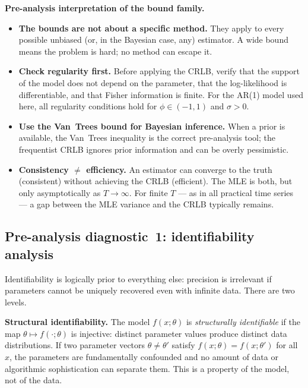 \documentclass[11pt, a4paper]{article}
\begin{document}
\begin{keybox}
\textbf{Pre-analysis interpretation of the bound family.}

\smallskip
\begin{itemize}[noitemsep]
    \item \textbf{The bounds are not about a specific method.}
    They apply to every possible unbiased (or, in the Bayesian case, any) estimator.
    A wide bound means the problem is hard; no method can escape it.
    \item \textbf{Check regularity first.}
    Before applying the CRLB, verify that the support of the model does not depend
    on the parameter, that the log-likelihood is differentiable, and that Fisher
    information is finite.
    For the AR(1) model used here, all regularity conditions hold for
    $\phi \in (-1,1)$ and $\sigma > 0$.
    \item \textbf{Use the Van~Trees bound for Bayesian inference.}
    When a prior is available, the Van~Trees inequality is the correct pre-analysis
    tool; the frequentist CRLB ignores prior information and can be overly
    pessimistic.
    \item \textbf{Consistency $\neq$ efficiency.}
    An estimator can converge to the truth (consistent) without achieving the CRLB
    (efficient).
    The MLE is both, but only asymptotically as $T\to\infty$.
    For finite $T$ --- as in all practical time series --- a gap between the MLE
    variance and the CRLB typically remains.
\end{itemize}
\end{keybox}

\subsection*{Pre-analysis diagnostic~1: identifiability analysis}
\label{sec:identifiability}

Identifiability is logically prior to everything else: precision is irrelevant if
parameters cannot be uniquely recovered even with infinite data.
There are two levels.

\medskip
\noindent\textbf{Structural identifiability.}
The model $f(x;\theta)$ is \emph{structurally identifiable} if the map
$\theta \mapsto f(\cdot;\theta)$ is injective: distinct parameter values produce
distinct data distributions.
If two parameter vectors $\theta \neq \theta'$ satisfy
$f(x;\theta) = f(x;\theta')$ for all $x$, the parameters are fundamentally
confounded and no amount of data or algorithmic sophistication can separate them.
This is a property of the model, not of the data.
\end{document}

